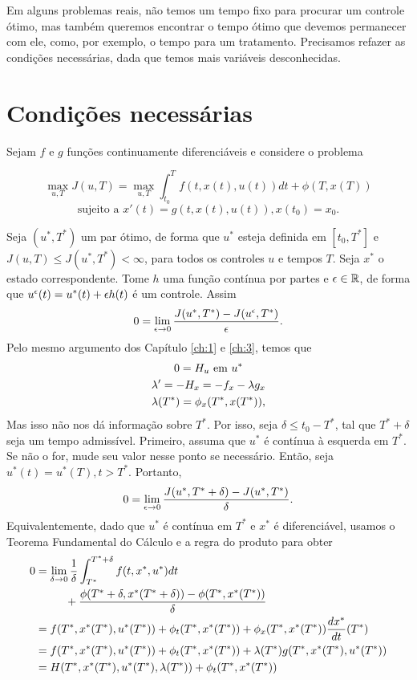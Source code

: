 Em alguns problemas reais, não temos um tempo fixo para procurar um controle
ótimo, mas também queremos encontrar o tempo ótimo que devemos permanecer com
ele, como, por exemplo, o tempo para um tratamento. Precisamos refazer as
condições necessárias, dada que temos mais variáveis desconhecidas.  

\section{Condições necessárias}

Sejam $f$ e $g$ funções continuamente diferenciáveis e considere o problema 

$$
\max_{u,T} J(u,T) = \max_{u,T} \int_{t_0}^T f(t, x(t), u(t))dt + \phi(T, x(T))
$$
$$
\text{sujeito a   }x'(t) = g(t, x(t), u(t)), x(t_0) = x_0.
$$

Seja $(u^*, T^*)$ um par ótimo, de forma que $u^*$ esteja definida em $[t_0,
T^*]$ e $J(u, T) \le J(u^*, T^*) < \infty$, para todos os controles $u$ e
tempos $T$. Seja $x^*$ o estado correspondente. Tome $h$ uma função contínua
por partes e $\epsilon \in \mathbb{R}$, de forma que $u^{\epsilon}(t) = u^*(t) + \epsilon h(t)$
é um controle. Assim 
\begin{equation*}
    0 = \lim_{\epsilon \to 0} \frac{J(u^*, T^*) - J(u^{\epsilon}, T^*)}{\epsilon}.
\end{equation*}
Pelo mesmo argumento dos Capítulo \ref{ch:1} e \ref{ch:3}, temos que 
\begin{gather*}
    0 = H_u \text{ em } u^* \\
    \lambda ' = - H_x = -f_x - \lambda g_x \\
    \lambda(T^*) = \phi_x(T^*, x(T^*)),
\end{gather*}
Mas isso não nos dá informação sobre $T^*$. Por isso, seja $\delta \le t_0 -
T^*$, tal que $T^* + \delta$ seja um tempo admissível. Primeiro, assuma que
$u^*$ é contínua à esquerda em $T^*$. Se não o for, mude seu valor nesse ponto
se necessário. Então, seja $u^*(t) = u^*(T), t > T^*$. Portanto, 
\begin{equation*}
    0 = \lim_{\epsilon \to 0} \frac{J(u^*, T^* + \delta) - J(u^*, T^*)}{\delta}.
\end{equation*}
Equivalentemente, dado que $u^*$ é contínua em $T^*$ e $x^*$ é diferenciável,
usamos o Teorema Fundamental do Cálculo e a regra do produto para obter
\begin{equation*}
    \begin{split}
        0 &= \lim_{\delta \to 0} \frac{1}{\delta}\int_{T^*}^{T^* + \delta} f(t, x^*, u^*) dt \\ 
        &~~~~~~~~+ \frac{\phi(T^* + \delta, x^*(T^* + \delta)) - \phi(T^*, x^*(T^*))}{\delta} \\
        &= f(T^*, x^*(T^*), u^*(T^*)) + \phi_t(T^*, x^*(T^*)) + \phi_x(T^*, x^*(T^*))\frac{dx^*}{dt}(T^*) \\
        &=  f(T^*, x^*(T^*), u^*(T^*)) + \phi_t(T^*, x^*(T^*)) + \lambda(T^*)g(T^*, x^*(T^*), u^*(T^*)) \\
        &= H(T^*, x^*(T^*), u^*(T^*), \lambda(T^*)) + \phi_t(T^*, x^*(T^*))
    \end{split}
\end{equation*}

